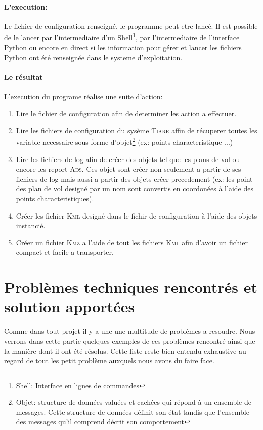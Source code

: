             \paragraph{L'execution:}
Le fichier de configuration renseigné, le programme peut etre lancé. Il est possible de le lancer par l'intermediaire d'un Shell\footnote{Shell: Interface en lignes de commandes}, par l'intermediaire de l'interface Python ou encore en direct si les information pour gérer et lancer les fichiers Python ont été renseignée dans le systeme d'exploitation.
            \paragraph{Le résultat}
L'execution du programe réalise une suite d'action:
\begin{enumerate}
    \item Lire le fichier de configuration afin de determiner les action a effectuer.
    \item Lire les fichiers de configuration du sysème \textsc{Tiare} affin de récuperer toutes les variable necessaire sous forme d'objet\footnote{Objet: structure de données valuées et cachées qui répond à un ensemble de messages. Cette structure de données définit son état tandis que l'ensemble des messages qu'il comprend décrit son comportement} (ex: points characteristique ...)
    \item Lire les fichiers de log afin de créer des objets tel que les plans de vol ou encore les report \textsc{Ads}. Ces objet sont créer non seulement a partir de ses fichiers de log mais aussi a partir des objets créer precedement (ex: les point des plan de vol designé par un nom sont convertis en coordonées à l'aide des points characteristiques).
    \item Créer les fichier \textsc{Kml} designé dans le fichir de configuration à l'aide des objets instancié.
    \item Créer un fichier \textsc{Kmz} a l'aide de tout les fichiers \textsc{Kml} afin d'avoir un fichier compact et facile a transporter.
\end{enumerate}


\section{Problèmes techniques rencontrés et solution apportées}
Comme dans tout projet il y a une une multitude de problèmes a resoudre. Nous verrons dans cette partie quelques exemples de ces problèmes rencontré ainsi que la manière dont il ont été résolus. Cette liste reste bien entendu exhaustive au regard de tout les petit problème auxquels nous avons du faire face.

